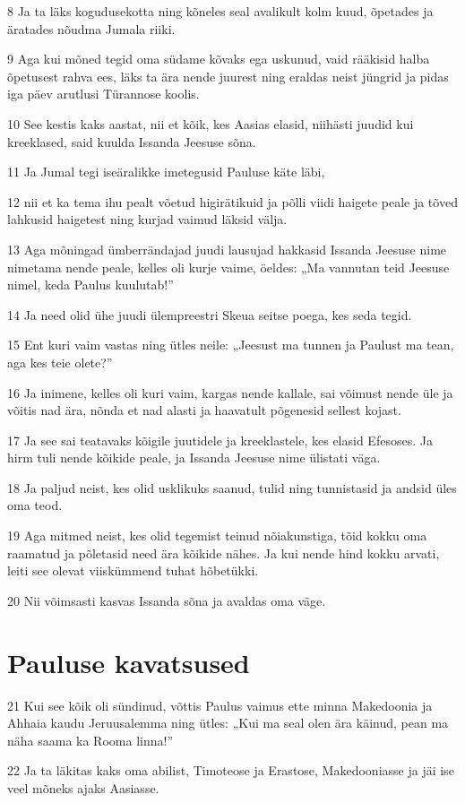 \par 8 Ja ta läks kogudusekotta ning kõneles seal avalikult kolm kuud, õpetades ja äratades nõudma Jumala riiki.
\par 9 Aga kui mõned tegid oma südame kõvaks ega uskunud, vaid rääkisid halba õpetusest rahva ees, läks ta ära nende juurest ning eraldas neist jüngrid ja pidas iga päev arutlusi Türannose koolis.
\par 10 See kestis kaks aastat, nii et kõik, kes Aasias elasid, niihästi juudid kui kreeklased, said kuulda Issanda Jeesuse sõna.
\par 11 Ja Jumal tegi iseäralikke imetegusid Pauluse käte läbi,
\par 12 nii et ka tema ihu pealt võetud higirätikuid ja põlli viidi haigete peale ja tõved lahkusid haigetest ning kurjad vaimud läksid välja.
\par 13 Aga mõningad ümberrändajad juudi lausujad hakkasid Issanda Jeesuse nime nimetama nende peale, kelles oli kurje vaime, öeldes: „Ma vannutan teid Jeesuse nimel, keda Paulus kuulutab!”
\par 14 Ja need olid ühe juudi ülempreestri Skeua seitse poega, kes seda tegid.
\par 15 Ent kuri vaim vastas ning ütles neile: „Jeesust ma tunnen ja Paulust ma tean, aga kes teie olete?”
\par 16 Ja inimene, kelles oli kuri vaim, kargas nende kallale, sai võimust nende üle ja võitis nad ära, nõnda et nad alasti ja haavatult põgenesid sellest kojast.
\par 17 Ja see sai teatavaks kõigile juutidele ja kreeklastele, kes elasid Efesoses. Ja hirm tuli nende kõikide peale, ja Issanda Jeesuse nime ülistati väga.
\par 18 Ja paljud neist, kes olid usklikuks saanud, tulid ning tunnistasid ja andsid üles oma teod.
\par 19 Aga mitmed neist, kes olid tegemist teinud nõiakunstiga, tõid kokku oma raamatud ja põletasid need ära kõikide nähes. Ja kui nende hind kokku arvati, leiti see olevat viiskümmend tuhat hõbetükki.
\par 20 Nii võimsasti kasvas Issanda sõna ja avaldas oma väge.

\section*{Pauluse kavatsused}

\par 21 Kui see kõik oli sündinud, võttis Paulus vaimus ette minna Makedoonia ja Ahhaia kaudu Jeruusalemma ning ütles: „Kui ma seal olen ära käinud, pean ma näha saama ka Rooma linna!”
\par 22 Ja ta läkitas kaks oma abilist, Timoteose ja Erastose, Makedooniasse ja jäi ise veel mõneks ajaks Aasiasse.

